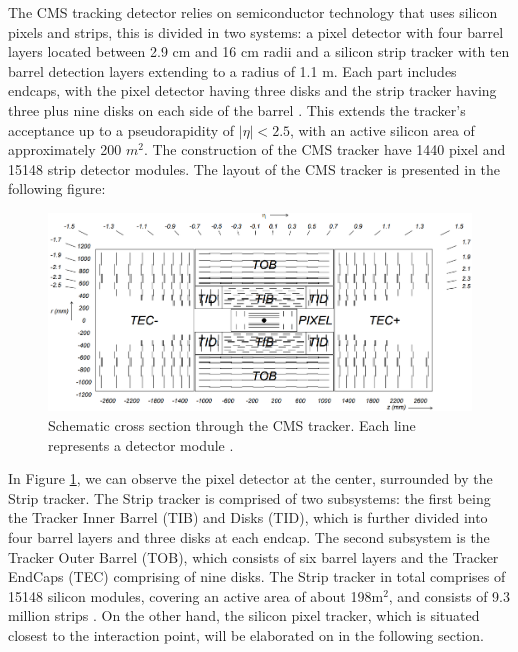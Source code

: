 The CMS tracking detector relies on semiconductor technology that uses silicon pixels and strips, this is divided in two systems: a pixel detector with four barrel layers located between 2.9 cm and 16 cm radii and a silicon strip tracker with ten barrel detection layers extending to a radius of 1.1 m. Each part includes endcaps, with the pixel detector having three disks and the strip tracker having three plus nine disks on each side of the barrel \cite{CMS_Exp_2008}. This extends the tracker's acceptance up to a pseudorapidity of $|\eta| < 2.5$, with an active silicon area of approximately 200 $m^2$. The construction of the CMS tracker have 1440 pixel and 15148 strip detector modules. The layout of the CMS tracker is presented in the following figure:

\begin{center}
  \begin{figure}[ht]
    \centering
    \includegraphics[scale=.23]{Chapter2/strip_layout.png}
    \caption[Schematic cross section through the CMS tracker]{Schematic cross section through the CMS tracker. Each line represents a detector module \cite{CMS_Exp_2008}.}
    \label{strip_layout}
  \end{figure}
\end{center}

In Figure \ref{strip_layout}, we can observe the pixel detector at the center, surrounded by the Strip tracker. The Strip tracker is comprised of two subsystems: the first being the Tracker Inner Barrel (TIB) and Disks (TID), which is further divided into four barrel layers and three disks at each endcap. The second subsystem is the Tracker Outer Barrel (TOB), which consists of six barrel layers and the Tracker EndCaps (TEC) comprising of nine disks. The Strip tracker in total comprises of 15148 silicon modules, covering an active area of about 198$\text{m}^{2}$, and consists of 9.3 million strips \cite{CMS_Exp_2008}. On the other hand, the silicon pixel tracker, which is situated closest to the interaction point, will be elaborated on in the following section.

